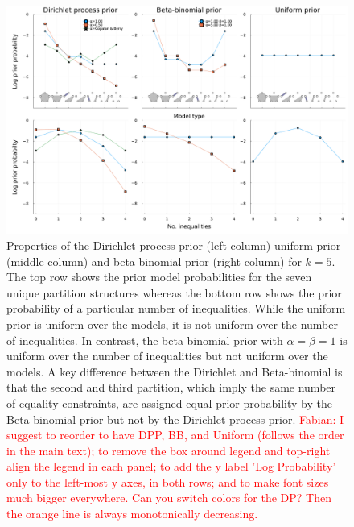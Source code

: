\documentclass[11pt,a4paper]{article}
\theoremstyle{definition} %
\theoremstyle{case}
\begin{document}
\begin{figure}
    \centering
    \includegraphics[width = \textwidth]{figures/visualizePriors_2x3.pdf}
    \caption{
    Properties of the Dirichlet process prior (left column) uniform prior (middle column) and beta-binomial prior (right column) for $k = 5$. The top row shows the prior model probabilities for the seven unique partition structures whereas the bottom row shows the prior probability of a particular number of inequalities. While the uniform prior is uniform over the models, it is not uniform over the number of inequalities. In contrast, the beta-binomial prior with $\alpha = \beta = 1$ is uniform over the number of inequalities but not uniform over the models. A key difference between the Dirichlet and Beta-binomial is that the second and third partition, which imply the same number of equality constraints, are assigned equal prior probability by the Beta-binomial prior but not by the Dirichlet process prior. \textcolor{red}{Fabian: I suggest to reorder to have DPP, BB, and Uniform (follows the order in the main text); to remove the box around legend and top-right align the legend in each panel; to add the y label 'Log Probability' only to the left-most y axes, in both rows; and to make font sizes much bigger everywhere. Can you switch colors for the DP? Then the orange line is always monotonically decreasing.}
    }
    \label{fig:prior-comparison}
\end{figure}
\end{document}
